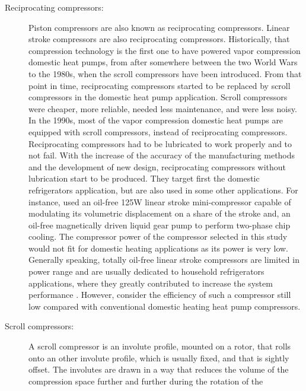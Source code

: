 \begin{description}
\item[Reciprocating compressors:] Piston compressors are also known as
  reciprocating compressors. Linear stroke compressors are also
  reciprocating compressors. Historically, that compression technology
  is the first one to have powered vapor compression domestic heat
  pumps, from after somewhere between the two World Wars
  \citep[p.\,23]{zogg-2008a} to the 1980s, when the scroll compressors
  have been introduced. From that point in time, reciprocating
  compressors started to be replaced by scroll compressors in the
  domestic heat pump application. Scroll compressors were cheaper,
  more reliable, needed less maintenance, and were less noisy. In the
  1990s, most of the vapor compression domestic heat pumps are
  equipped with scroll compressors, instead of reciprocating
  compressors. Reciprocating compressors had to be lubricated to work
  properly and to not fail. With the increase of the accuracy of the
  manufacturing methods and the development of new design,
  reciprocating compressors without lubrication start to be
  produced. They target first the domestic refrigerators application,
  but are also used in some other applications. For instance,
  \citet{Marcinichen-Michel-2014a} used an oil-free 125W
  \citep[Tab.\,1, p.\,183]{Marcinichen-Michel-2014a} linear stroke
  mini-compressor capable of modulating its volumetric displacement on
  a share of the stroke \citep[p.\,183]{Marcinichen-Michel-2014a} and,
  an oil-free magnetically driven liquid gear pump to perform
  two-phase chip cooling. The compressor power of the compressor
  selected in this study would not fit for domestic heating
  applications as its power is very low. Generally speaking, totally
  oil-free linear stroke compressors are limited in power range and
  are usually dedicated to household refrigerators applications, where
  they greatly contributed to increase the system performance
  \citep{Bansal-Abdelaziz-2011a}. However,
  \citet[p.\,186]{Marcinichen-Michel-2014a} consider the efficiency of
  such a compressor still low compared with conventional domestic
  heating heat pump compressors.
\item[Scroll compressors:]\label{sec:sota-scroll}A scroll compressor
  is an involute profile, mounted on a rotor, that rolls onto an other
  involute profile, which is usually fixed, and that is sightly
  offset. The involutes are drawn in a way that reduces the volume of
  the compression space further and further during the rotation of the

\end{description}
